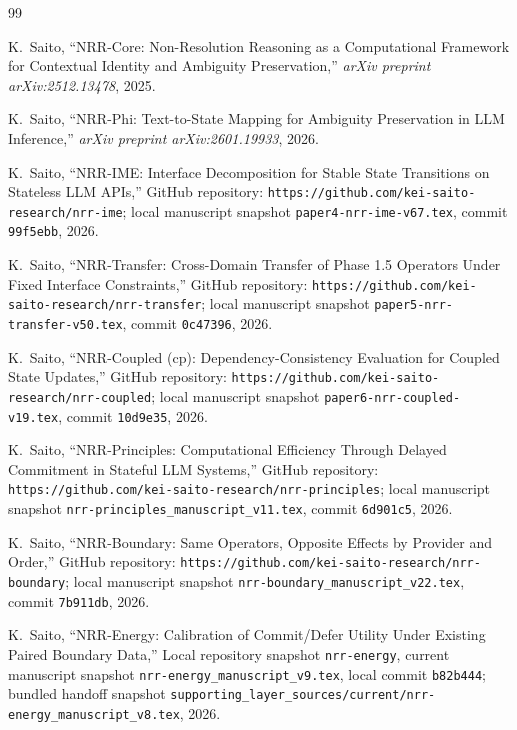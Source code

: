 \documentclass[11pt]{article}
\begin{document}
\begin{thebibliography}{99}
\raggedright

K.~Saito,
\newblock ``NRR-Core: Non-Resolution Reasoning as a Computational Framework for Contextual Identity and Ambiguity Preservation,''
\newblock \emph{arXiv preprint arXiv:2512.13478}, 2025.

K.~Saito,
\newblock ``NRR-Phi: Text-to-State Mapping for Ambiguity Preservation in LLM Inference,''
\newblock \emph{arXiv preprint arXiv:2601.19933}, 2026.

K.~Saito,
\newblock ``NRR-IME: Interface Decomposition for Stable State Transitions on Stateless LLM APIs,''
\newblock GitHub repository: \texttt{https://github.com/kei-saito-research/nrr-ime}; local manuscript snapshot \texttt{paper4-nrr-ime-v67.tex}, commit \texttt{99f5ebb}, 2026.

K.~Saito,
\newblock ``NRR-Transfer: Cross-Domain Transfer of Phase 1.5 Operators Under Fixed Interface Constraints,''
\newblock GitHub repository: \texttt{https://github.com/kei-saito-research/nrr-transfer}; local manuscript snapshot \texttt{paper5-nrr-transfer-v50.tex}, commit \texttt{0c47396}, 2026.

K.~Saito,
\newblock ``NRR-Coupled (cp): Dependency-Consistency Evaluation for Coupled State Updates,''
\newblock GitHub repository: \texttt{https://github.com/kei-saito-research/nrr-coupled}; local manuscript snapshot \texttt{paper6-nrr-coupled-v19.tex}, commit \texttt{10d9e35}, 2026.

K.~Saito,
\newblock ``NRR-Principles: Computational Efficiency Through Delayed Commitment in Stateful LLM Systems,''
\newblock GitHub repository: \texttt{https://github.com/kei-saito-research/nrr-principles}; local manuscript snapshot \texttt{nrr-principles_manuscript_v11.tex}, commit \texttt{6d901c5}, 2026.

K.~Saito,
\newblock ``NRR-Boundary: Same Operators, Opposite Effects by Provider and Order,''
\newblock GitHub repository: \texttt{https://github.com/kei-saito-research/nrr-boundary}; local manuscript snapshot \texttt{nrr-boundary_manuscript_v22.tex}, commit \texttt{7b911db}, 2026.

K.~Saito,
\newblock ``NRR-Energy: Calibration of Commit/Defer Utility Under Existing Paired Boundary Data,''
\newblock Local repository snapshot \texttt{nrr-energy}, current manuscript snapshot \texttt{nrr-energy_manuscript_v9.tex}, local commit \texttt{b82b444}; bundled handoff snapshot \texttt{supporting\_layer\_sources/current/nrr-energy\_manuscript\_v8.tex}, 2026.


\end{thebibliography}
\end{document}
